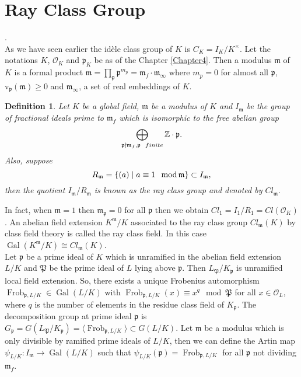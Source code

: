 \documentclass{article}
\newtheorem{definition}{Definition}[section]
\theoremstyle{break}
\newtheorem{theorem}{Theorem}[section]
\def\Gal{\mathop{\mathrm{Gal}}\nolimits}
\def\Gal{\mathop{\mathrm{Gal}}\nolimits}
\def\modulo{\mathop{\mathrm{mod}}\nolimits}
\def\Frob{\mathop{\mathrm{Frob}}\nolimits}
\def\Gal{\mathop{\mathrm{Gal}}\nolimits}
\def\modulo{\mathop{\mathrm{mod }}\nolimits}
\def\v{\mathop{\mathrm{v}}\nolimits}
\def\v{\mathrm{v}}
\begin{document}


\section{Ray Class Group}
\cite{Hofmann}.\\
As we have seen earlier the id\`ele class group of $K$ is $C_K= I_{K}/K^{\times}$. Let the notations $K$, $\mathcal{O}_{K}$ and $\mathfrak{p}_{K}$ be as of the Chapter \ref{Chapter4}. Then a modulus $\mathfrak{m}$ of $K$ is a formal product $\mathfrak{m}=\prod_{\mathfrak{p}}^{} \mathfrak{p}^{m_{p}}=\mathfrak{m}_{f}\cdot \mathfrak{m}_{\infty}$ where $m_p =0$ for almost all $\mathfrak{p}$,  $\v_{\mathfrak{p}}(\mathfrak{m}) \ge 0$ and $ \mathfrak{m}_{\infty}$, a set of real embeddings of $K$.
\begin{definition}
Let $K$ be a global field, $\mathfrak{m}$ be a modulus of $K$ and $I_{\mathfrak{m}}$ be the group of fractional ideals  prime to $\mathfrak{m}_f$ which is isomorphic to the free abelian group \[\bigoplus_{\mathfrak{p} \nmid \mathfrak{m}_f , \mathfrak{p}\hspace{2mm} finite } \mathbb{Z}\cdot \mathfrak{p}.  \]
Also, suppose 
\[ R_{\mathfrak{m}} = \{(a) \mid a \equiv 1 \hspace{2mm} \modulo  \mathfrak{m} \} \subset I_{\mathfrak{m}},\]
then the quotient $I_{\mathfrak{m}}/ R_{\mathfrak{m}}$ is known as the ray class group and denoted by $Cl_{\mathfrak{m}}.$ 
\end{definition}
In fact, when $\mathfrak{m} =1$ then $\mathfrak{m}_{\mathfrak{p}}=0$ for all $\mathfrak{p}$ then we obtain $Cl_{1}=I_{1}/R_{1}=Cl(\mathcal{O}_{K})$. An abelian field extension $K^{\mathfrak{m}}/ K$ associated to the ray class group $Cl_{\mathfrak{m}}(K)$ by class field theory is called the ray class field. In this case $\Gal(K^{\mathfrak{m}}/ K) \cong Cl_{\mathfrak{m}}(K)$. \\
Let  $\mathfrak{p}$ be a prime ideal of $K$ which is unramified in the abelian field extension $L/K$ and $\mathfrak{P}$ be the prime ideal of $L$ lying above $\mathfrak{p}$. Then $L_{\mathfrak{P}}/K_{\mathfrak{p}} $ is unramified local field extension. So, there exists a unique Frobenius automorphism $\Frob_{\mathfrak{p},L/K} \in \Gal(L/K)$ with $\Frob_{\mathfrak{p}, L/K}(x)\equiv x^q \mod \mathfrak{P}$ for all $x \in \mathcal{O}_{L}$, where $q$ is the number of elements in the residue class field of $K_{\mathfrak{p}}$. The decomposition group at prime ideal $\mathfrak{p}$ is $G_{\mathfrak{p}}= G(L_{\mathfrak{P}} / K_{\mathfrak{p}})= \langle \Frob_{\mathfrak{p}, L/K} \rangle\subset G(L/K)$. Let $\mathfrak{m}$ be a modulus  which is only divisible by ramified prime ideals of $L/K$, then we can define the Artin map $\psi_{L/K}: I_{\mathfrak{m}} \rightarrow \Gal(L/K)$ such that $\psi_{L/K}(\mathfrak{p})= \Frob_{\mathfrak{p}, L/K}$ for all $\mathfrak{p}$ not dividing $\mathfrak{m}_f$. \\
\end{document}
